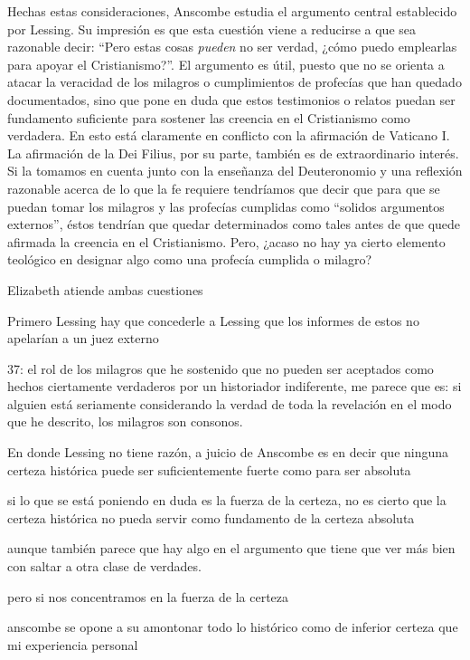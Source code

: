 Hechas estas consideraciones, Anscombe estudia el argumento central establecido
por Lessing. Su impresión es que esta cuestión viene a reducirse a que sea
razonable decir: \enquote{Pero estas cosas \emph{pueden} no ser verdad, ¿cómo
  puedo emplearlas para apoyar el Cristianismo?}. El argumento es útil, puesto
que no se orienta a atacar la veracidad de los milagros o cumplimientos de
profecías que han quedado documentados, sino que pone en duda que estos
testimonios o relatos puedan ser fundamento suficiente para sostener las
creencia en el Cristianismo como verdadera. En esto está claramente en conflicto
con la afirmación de Vaticano I. La afirmación de la Dei Filius, por su parte,
también es de extraordinario interés. Si la tomamos en cuenta junto con la
enseñanza del Deuteronomio y una reflexión razonable acerca de lo que la fe
requiere tendríamos que decir que para que se puedan tomar los milagros y las
profecías cumplidas como \enquote{solidos argumentos externos}, éstos tendrían
que quedar determinados como tales antes de que quede afirmada la creencia en el
Cristianismo. Pero, ¿acaso no hay ya cierto elemento teológico en designar algo
como una profecía cumplida o milagro?



Elizabeth atiende ambas cuestiones

Primero Lessing
hay que concederle a Lessing que los informes de estos no apelarían a un juez
externo

37: el rol de los milagros que he sostenido que no pueden ser aceptados como
hechos ciertamente verdaderos por un historiador indiferente, me parece que es:
si alguien está seriamente considerando la verdad de toda la revelación en el
modo que he descrito, los milagros son consonos. 

En donde Lessing no tiene razón, a juicio de Anscombe es en decir que ninguna
certeza histórica puede ser suficientemente fuerte como para ser absoluta

si lo que se está poniendo en duda es la fuerza de la certeza, no es cierto que
la certeza histórica no pueda servir como fundamento de la certeza absoluta 

aunque también parece que hay algo en el argumento que tiene que ver más bien
con saltar a otra clase de verdades.

pero si nos concentramos en la fuerza de la certeza

anscombe se opone a su amontonar todo lo histórico como de inferior certeza que
mi experiencia personal

